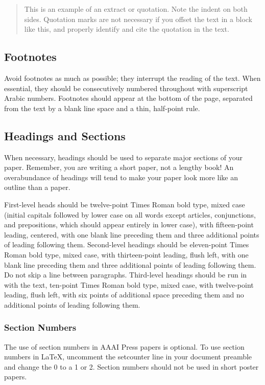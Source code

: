 \documentclass[letterpaper]{article}
\begin{document}
\begin{quote}
This is an example of an extract or quotation. Note the indent on both sides. Quotation marks are not necessary if you offset the text in a block like this, and properly identify and cite the quotation in the text. 

\end{quote}

\subsection{Footnotes}
Avoid footnotes as much as possible; they interrupt the reading of the text. When essential, they should be consecutively numbered throughout with superscript Arabic numbers. Footnotes should appear at the bottom of the page, separated from the text by a blank line space and a thin, half-point rule. 

\subsection{Headings and Sections}
When necessary, headings should be used to separate major sections of your paper. Remember, you are writing a short paper, not a lengthy book! An overabundance of headings will tend to make your paper look more like an outline than a paper.

First-level heads should be twelve-point Times Roman bold type, mixed case (initial capitals followed by lower case on all words except articles, conjunctions, and prepositions, which should appear entirely in lower case), with fifteen-point leading, centered, with one blank line preceding them and three additional points of leading following them. Second-level headings should be eleven-point Times Roman bold type, mixed case, with thirteen-point leading, flush left, with one blank line preceding them and three additional points of leading following them. Do not skip a line between paragraphs. Third-level headings should be run in with the text, ten-point Times Roman bold type, mixed case, with twelve-point leading, flush left, with six points of additional space preceding them and no additional points of leading following them.

\subsubsection{Section Numbers}
The use of section numbers in AAAI Press papers is optional. To use section numbers in \LaTeX{}, uncomment the setcounter line in your document preamble and change the 0 to a 1 or 2. Section numbers should not be used in short poster papers.
\end{document}

